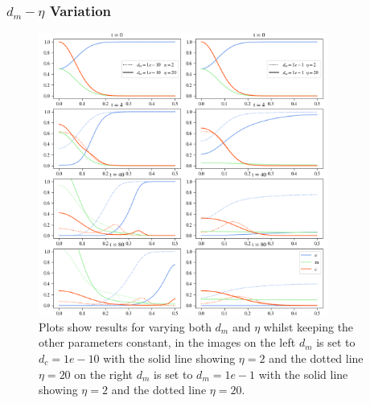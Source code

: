 \subsubsection*{$d_m - \eta$ Variation}
\begin{figure}[h]
    \centering
    \includegraphics[width=0.85\textwidth]{resources/images/dm_eta_variation.png}
    \caption{Plots show results for varying both $d_m$ and $\eta$ whilst keeping the other parameters constant, in the images on the left $d_m$ is set to $d_c=1e-10$ with the solid line showing $\eta = 2$ and the dotted line $\eta=20$ on the right $d_m$ is set to $d_m=1e-1$ with the solid line showing $\eta = 2$ and the dotted line $\eta=20$.}
    \label{fig:dm_eta_variation}
\end{figure}
